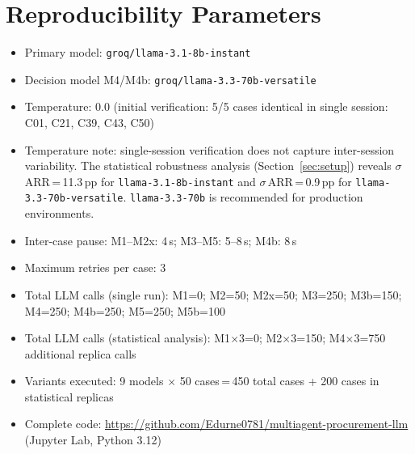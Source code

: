\documentclass[preprint,12pt,authoryear]{elsarticle}
\begin{document}
\section{Reproducibility Parameters}
\label{app:repro}

\begin{itemize}
  \item Primary model: \texttt{groq/llama-3.1-8b-instant}
  \item Decision model M4/M4b: \texttt{groq/llama-3.3-70b-versatile}
  \item Temperature: 0.0 (initial verification: 5/5 cases identical in single
        session: C01, C21, C39, C43, C50)
  \item Temperature note: single-session verification does not capture
        inter-session variability.
        The statistical robustness analysis (Section~\ref{sec:setup}) reveals
        $\sigma$\,ARR\,=\,11.3\,pp for \texttt{llama-3.1-8b-instant} and
        $\sigma$\,ARR\,=\,0.9\,pp for \texttt{llama-3.3-70b-versatile}.
        \texttt{llama-3.3-70b} is recommended for production environments.
  \item Inter-case pause: M1--M2x: 4\,s; M3--M5: 5--8\,s; M4b: 8\,s
  \item Maximum retries per case: 3
  \item Total LLM calls (single run): M1=0; M2=50; M2x=50; M3=250; M3b=150;
        M4=250; M4b=250; M5=250; M5b=100
  \item Total LLM calls (statistical analysis): M1$\times$3=0;
        M2$\times$3=150; M4$\times$3=750 additional replica calls
  \item Variants executed: 9 models $\times$ 50 cases\,=\,450 total cases
        + 200 cases in statistical replicas
  \item Complete code: \url{https://github.com/Edurne0781/multiagent-procurement-llm}
        (Jupyter Lab, Python 3.12)
\end{itemize}
\end{document}
